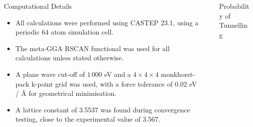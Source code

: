\documentclass[final]{beamer}
\newlength{\sepwidth}
\newlength{\colwidth}
\newcommand{\separatorcolumn}{\begin{column}{\sepwidth}\end{column}}
\begin{document}
\begin{frame}[t]
\begin{columns}[t]
\begin{column}{\colwidth}
  \begin{alertblock}{Computational Details}
    \begin{itemize}
        \item All calculations were performed using CASTEP 23.1, using a periodic 64 atom simulation cell.
        \item The meta-GGA RSCAN functional was used for all calculations unless stated otherwise. 
        \item A plane wave cut-off of $1\,000$ eV and a $4\times 4\times 4$ monkhorst-pack k-point grid was used, with a force tolerance of 0.02 eV / {\AA} for geometrical minimisation.
        \item A lattice constant of 3.5537 was found during convergence testing, close to the experimental value of 3.567.
    \end{itemize}

  \end{alertblock}

\end{column}

\separatorcolumn

\begin{column}{\colwidth}

  \begin{block}{Probability of Tunnelling}


\end{block}
\end{column}
\end{columns}
\end{frame}
\end{document}
